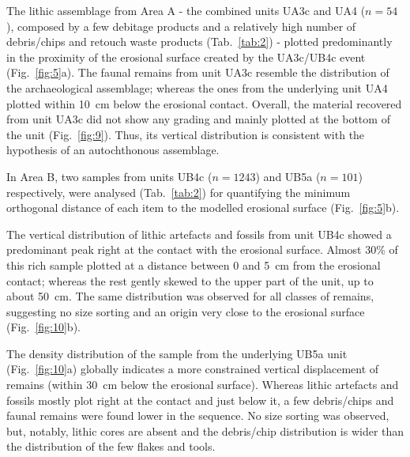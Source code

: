 \documentclass[preprint,authoryear,times]{elsarticle} %
\begin{document}

The lithic assemblage from Area A - the combined units UA3c and UA4 ($n = 54$), composed by a few debitage products and a relatively high number of debris/chips and retouch waste products (Tab.~\ref{tab:2}) - plotted predominantly in the proximity of the erosional surface created by the UA3c/UB4c event (Fig.~\ref{fig:5}a). The faunal remains from unit UA3c resemble the distribution of the archaeological assemblage; whereas the ones from the underlying unit UA4 plotted within 10~cm below the erosional contact. Overall, the material recovered from unit UA3c did not show any grading and mainly plotted at the bottom of the unit (Fig.~\ref{fig:9}). Thus, its vertical distribution is consistent with the hypothesis of an autochthonous assemblage.


In Area B, two samples from units UB4c ($n = 1243$) and UB5a ($n = 101$) respectively, were analysed (Tab.~\ref{tab:2}) for quantifying the minimum orthogonal distance of each item to the modelled erosional surface (Fig.~\ref{fig:5}b).

The vertical distribution of lithic artefacts and fossils from unit UB4c showed a predominant peak right at the contact with the erosional surface. Almost 30\% of this rich sample plotted at a distance between 0 and 5~cm from the erosional contact; whereas the rest gently skewed to the upper part of the unit, up to about 50~cm. The same distribution was observed for all classes of remains, suggesting no size sorting and an origin very close to the erosional surface (Fig.~\ref{fig:10}b).

The density distribution of the sample from the underlying UB5a unit (Fig.~\ref{fig:10}a) globally indicates a more constrained vertical displacement of remains (within 30~cm below the erosional surface). Whereas lithic artefacts and fossils mostly plot right at the contact and just below it, a few debris/chips and faunal remains were found lower in the sequence. No size sorting was observed, but, notably, lithic cores are absent and the debris/chip distribution is wider than the distribution of the few flakes and tools.
\end{document}
